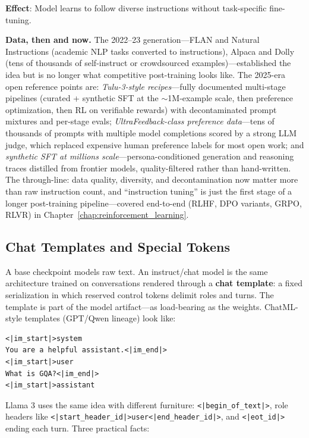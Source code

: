 \textbf{Effect}: Model learns to follow diverse instructions without task-specific fine-tuning.

\textbf{Data, then and now.} The 2022--23 generation---FLAN and Natural Instructions (academic NLP tasks converted to instructions), Alpaca and Dolly (tens of thousands of self-instruct or crowdsourced examples)---established the idea but is no longer what competitive post-training looks like. The 2025-era open reference points are: \textit{Tulu-3-style recipes}---fully documented multi-stage pipelines (curated + synthetic SFT at the $\sim$1M-example scale, then preference optimization, then RL on verifiable rewards) with decontaminated prompt mixtures and per-stage evals; \textit{UltraFeedback-class preference data}---tens of thousands of prompts with multiple model completions scored by a strong LLM judge, which replaced expensive human preference labels for most open work; and \textit{synthetic SFT at millions scale}---persona-conditioned generation and reasoning traces distilled from frontier models, quality-filtered rather than hand-written. The through-line: data quality, diversity, and decontamination now matter more than raw instruction count, and ``instruction tuning'' is just the first stage of a longer post-training pipeline---covered end-to-end (RLHF, DPO variants, GRPO, RLVR) in Chapter~\ref{chap:reinforcement_learning}.

\subsection{Chat Templates and Special Tokens}
\label{subsec:chat_templates}

A base checkpoint models raw text. An instruct/chat model is the same architecture trained on conversations rendered through a \textbf{chat template}: a fixed serialization in which reserved control tokens delimit roles and turns. The template is part of the model artifact---as load-bearing as the weights. ChatML-style templates (GPT/Qwen lineage) look like:

\begin{verbatim}
<|im_start|>system
You are a helpful assistant.<|im_end|>
<|im_start|>user
What is GQA?<|im_end|>
<|im_start|>assistant
\end{verbatim}

Llama 3 uses the same idea with different furniture: \verb+<|begin_of_text|>+, role headers like \verb+<|start_header_id|>+\allowbreak\verb+user<|end_header_id|>+, and \verb+<|eot_id|>+ ending each turn. Three practical facts:


